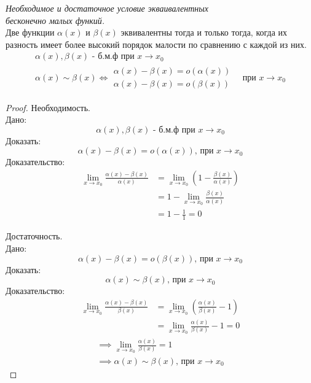 \begin{theorem}
  \textit{Необходимое и достаточное условие экваивалентных \\ бесконечно малых функий.} \\
  Две функции $\alpha(x)$ и $\beta(x)$ эквивалентны тогда и только тогда, когда их разность имеет более высокий порядок малости по сравнению с каждой из них.
  \begin{gather*}
    \alpha(x), \beta(x) \text{ - б.м.ф при } x \to x_0 \\
    \alpha(x) \sim \beta(x) \iff 
    \begin{matrix}
    \alpha(x) - \beta(x) = o(\alpha(x)) \\
    \alpha(x) - \beta(x) = o(\beta(x))
    \end{matrix}
    \quad \text{при } x \to x_0
  \end{gather*}
\end{theorem}
\begin{proof}
  Необходимость. \\
  Дано: \[
  \alpha(x), \beta(x) \text{ - б.м.ф при } x \to x_0
  \] 
  Доказать: \[
  \alpha(x) - \beta(x) = o(\alpha(x)) \text{, при } x \to x_0
  \] 
  Доказательство:
  \begin{align*}
    \lim_{x \to x_0} \frac{\alpha(x) - \beta(x)}{\alpha(x)} &= \lim_{x \to x_0} \left( 1 - \frac{\beta(x)}{\alpha(x)} \right) \\
    &= 1 - \lim_{x \to x_0} \frac{\beta(x)}{\alpha(x)} \\
    &= 1 - \frac{1}{1} = 0
  \end{align*}

  Достаточность. \\
  Дано: \[
  \alpha(x) - \beta(x) = o(\beta(x)) \text{, при } x \to x_0
  \]
  Доказать: \[
  \alpha(x) \sim \beta(x) \text{, при } x \to x_0
  \] 
  Доказательство:
  \begin{align*}
    \lim_{x \to x_0} \frac{\alpha(x) - \beta(x)}{\beta(x)} &= \lim_{x \to x_0} \left( \frac{\alpha(x)}{\beta(x)} - 1 \right)  \\
    &= \lim_{x \to x_0} \frac{\alpha(x)}{\beta(x)} - 1 = 0
  \end{align*}
  \begin{gather*}
    \implies \lim_{x \to x_0} \frac{\alpha(x)}{\beta(x)} = 1 \\
    \implies \alpha(x) \sim \beta(x) \text{, при } x \to x_0 
  \end{gather*}
\end{proof}

